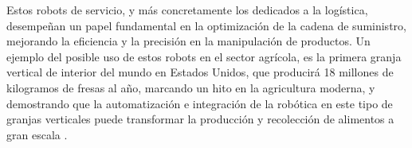 
Estos robots de servicio, y más concretamente los dedicados a la logística, desempeñan un papel fundamental en la optimización de la cadena de suministro, mejorando la eficiencia y la precisión en la manipulación de productos. Un ejemplo del posible uso de estos robots en el sector agrícola, es la primera granja vertical de interior del mundo en Estados Unidos, que producirá 18 millones de kilogramos de fresas al año, marcando un hito en la agricultura moderna, y demostrando que la automatización e integración de la robótica en este tipo de granjas verticales puede transformar la producción y recolección de alimentos a gran escala \cite{EcoInventos24}.\\
 
 
 
  
